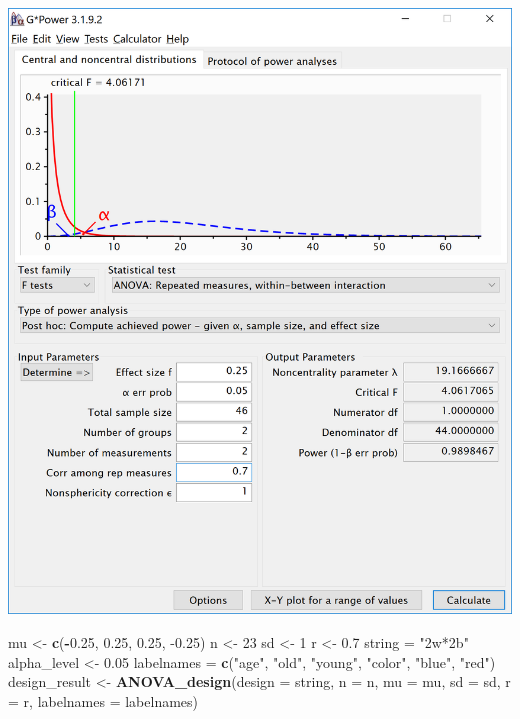 \documentclass[]{book}
\newenvironment{Shaded}{\begin{snugshade}}{\end{snugshade}}
\newcommand{\DataTypeTok}[1]{\textcolor[rgb]{0.13,0.29,0.53}{#1}}
\newcommand{\DecValTok}[1]{\textcolor[rgb]{0.00,0.00,0.81}{#1}}
\newcommand{\FloatTok}[1]{\textcolor[rgb]{0.00,0.00,0.81}{#1}}
\newcommand{\KeywordTok}[1]{\textcolor[rgb]{0.13,0.29,0.53}{\textbf{#1}}}
\newcommand{\NormalTok}[1]{#1}
\newcommand{\OperatorTok}[1]{\textcolor[rgb]{0.81,0.36,0.00}{\textbf{#1}}}
\newcommand{\StringTok}[1]{\textcolor[rgb]{0.31,0.60,0.02}{#1}}
\begin{document}
\includegraphics{screenshots/gpower_6.png}

\begin{Shaded}
\begin{Highlighting}[]
\NormalTok{mu <-}\StringTok{ }\KeywordTok{c}\NormalTok{(}\OperatorTok{-}\FloatTok{0.25}\NormalTok{, }\FloatTok{0.25}\NormalTok{, }\FloatTok{0.25}\NormalTok{, }\FloatTok{-0.25}\NormalTok{)}
\NormalTok{n <-}\StringTok{ }\DecValTok{23}
\NormalTok{sd <-}\StringTok{ }\DecValTok{1}
\NormalTok{r <-}\StringTok{ }\FloatTok{0.7}
\NormalTok{string =}\StringTok{ "2w*2b"}
\NormalTok{alpha_level <-}\StringTok{ }\FloatTok{0.05}
\NormalTok{labelnames =}\StringTok{ }\KeywordTok{c}\NormalTok{(}\StringTok{"age"}\NormalTok{, }\StringTok{"old"}\NormalTok{, }\StringTok{"young"}\NormalTok{, }\StringTok{"color"}\NormalTok{, }\StringTok{"blue"}\NormalTok{, }\StringTok{"red"}\NormalTok{)}
\NormalTok{design_result <-}\StringTok{ }\KeywordTok{ANOVA_design}\NormalTok{(}\DataTypeTok{design =}\NormalTok{ string,}
                              \DataTypeTok{n =}\NormalTok{ n, }
                              \DataTypeTok{mu =}\NormalTok{ mu, }
                              \DataTypeTok{sd =}\NormalTok{ sd, }
                              \DataTypeTok{r =}\NormalTok{ r, }
                              \DataTypeTok{labelnames =}\NormalTok{ labelnames)}
\end{Highlighting}
\end{Shaded}
\end{document}
